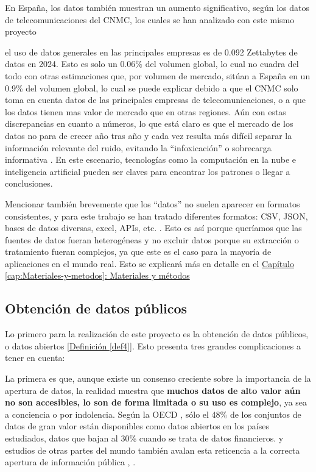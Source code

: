 En España, los datos también muestran un aumento significativo, según los datos de telecomunicaciones del CNMC, los cuales se han analizado con este mismo proyecto \citep{DatosGeneralesCNMC} 

el uso de datos generales en las principales empresas es de 0.092 Zettabytes de datos en 2024.
Esto es solo un 0.06\% del volumen global, lo cual no cuadra del todo con otras estimaciones \citep{DatosMercadosEspanna} que, por volumen de mercado, sitúan a España en un 0.9\% del volumen global, lo cual se puede explicar debido a que el CNMC solo toma en cuenta datos de las principales empresas de telecomunicaciones, o a que los datos tienen mas valor de mercado que en otras regiones. 
Aún con estas discrepancias en cuanto a números, lo que está claro es que el mercado de los datos no para de crecer año tras año y cada vez resulta más difícil separar la información relevante del ruido, evitando la ``infoxicación'' o sobrecarga informativa \citep{Infoxicacion}. En este escenario, tecnologías como la computación en la nube e inteligencia artificial pueden ser claves para encontrar los patrones o llegar a conclusiones.

Mencionar también brevemente que los ``datos'' no suelen aparecer en formatos consistentes, y para este trabajo se han tratado diferentes formatos: CSV, JSON, bases de datos diversas, excel, APIs, etc. \citep{khan2019fileFormats}. Esto es así porque queríamos que las fuentes de datos fueran heterogéneas y no excluir datos porque su extracción o tratamiento fueran complejos, ya que este es el caso para la mayoría de aplicaciones en el mundo real. Esto se explicará más en detalle en el \hyperref[cap:Materiales-y-metodos]{Capítulo \ref*{cap:Materiales-y-metodos}: Materiales y métodos} \\ %


\subsection{Obtención de datos públicos}
	
	Lo primero para la realización de este proyecto es la obtención de datos públicos, o datos abiertos \hyperref[def4]{[Definición \ref*{def4}]}. Esto presenta tres grandes complicaciones a tener en cuenta:
	
	La primera es que, aunque existe un consenso creciente sobre la importancia de la apertura de datos, la realidad muestra que \textbf{muchos datos de alto valor aún no son accesibles, lo son de forma limitada o su uso es complejo}, ya sea a conciencia o por indolencia. Según la OECD \citep{OECD2023openData}, sólo el 48\% de los conjuntos de datos de gran valor están disponibles como datos abiertos en los países estudiados, datos que bajan al 30\% cuando se trata de datos financieros. y estudios de otras partes del mundo también avalan esta reticencia a la correcta apertura de información pública \citep{TransparenciaEcuador}, \citep{TransparenciaMexico}.
	

